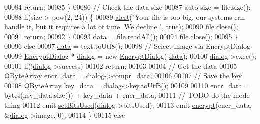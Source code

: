 \begin{DoxyCode}
00084                 \textcolor{keywordflow}{return};
00085             \}
00086             \textcolor{comment}{// Check the data size}
00087             \textcolor{keyword}{auto} size = file.size();
00088             \textcolor{keywordflow}{if}(size > pow(2, 24)) \{
00089                 \mbox{\hyperlink{class_view_p_c_a7c467169467789561078abc9d4fe57bd}{alert}}(\textcolor{stringliteral}{"Your file is too big, our systems can handle it, but it requires a lot of time.
       We decline."}, \textcolor{keyword}{true});
00090                 file.close();
00091                 \textcolor{keywordflow}{return};
00092             \}
00093             \mbox{\hyperlink{namespace_errors_dict_setup_af570460846fb9f0c91abd308a095dcdc}{data}} = file.readAll();
00094             file.close();
00095         \}
00096         \textcolor{keywordflow}{else}
00097             \mbox{\hyperlink{namespace_errors_dict_setup_af570460846fb9f0c91abd308a095dcdc}{data}} = text.toUtf8();
00098         \textcolor{comment}{// Select image via EncryptDialog}
00099         \mbox{\hyperlink{class_encrypt_dialog}{EncryptDialog}} * \mbox{\hyperlink{class_view_p_c_a31abbb470fe329b44e6ffee202b903ca}{dialog}} = \textcolor{keyword}{new} \mbox{\hyperlink{class_encrypt_dialog}{EncryptDialog}}(
      \mbox{\hyperlink{namespace_errors_dict_setup_af570460846fb9f0c91abd308a095dcdc}{data}});
00100         \mbox{\hyperlink{class_view_p_c_a31abbb470fe329b44e6ffee202b903ca}{dialog}}->exec();
00101         \textcolor{keywordflow}{if}(!\mbox{\hyperlink{class_view_p_c_a31abbb470fe329b44e6ffee202b903ca}{dialog}}->success)
00102             \textcolor{keywordflow}{return};
00103 
00104         \textcolor{comment}{// Get the data}
00105         QByteArray encr\_data = \mbox{\hyperlink{class_view_p_c_a31abbb470fe329b44e6ffee202b903ca}{dialog}}->compr\_data;
00106 
00107         \textcolor{comment}{// Save the key}
00108         QByteArray key\_data = \mbox{\hyperlink{class_view_p_c_a31abbb470fe329b44e6ffee202b903ca}{dialog}}->key.toUtf8();
00109 
00110         encr\_data = bytes(key\_data.size()) + key\_data + encr\_data;
00111         \textcolor{comment}{// TODO do the mode thing}
00112         emit \mbox{\hyperlink{class_view_p_c_a2ccc0a3f2f48080ae6308e800646fcd5}{setBitsUsed}}(\mbox{\hyperlink{class_view_p_c_a31abbb470fe329b44e6ffee202b903ca}{dialog}}->bitsUsed);
00113         emit \mbox{\hyperlink{class_view_p_c_ade35449b95cf1c5424c4eb929f46fd73}{encrypt}}(encr\_data, &\mbox{\hyperlink{class_view_p_c_a31abbb470fe329b44e6ffee202b903ca}{dialog}}->image, 0);
00114     \}
00115     \textcolor{keywordflow}{else}

\end{DoxyCode}
